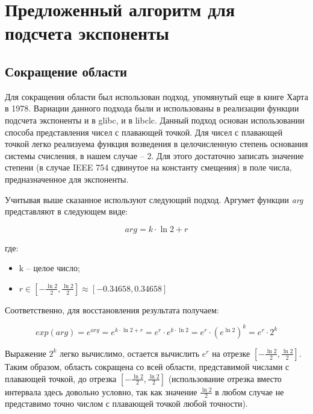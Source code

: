 \chapter{Предложенный алгоритм для подсчета экспоненты}

\section{Сокращение области}

Для сокращения области был использован подход, упомянутый еще в книге Харта\cite{hart} в 1978.
Вариации данного подхода были и использованы в реализации функции подсчета экспоненты и в glibc, и в libclc.
Данный подход основан использовании способа представления чисел с плавающей точкой.
Для чисел с плавающей точкой легко реализуема функция возведения в целочисленную степень основания системы счисления, в нашем случае -- 2.
Для этого достаточно записать значение степени (в случае IEEE 754 сдвинутое на константу смещения) в поле числа, предназначенное для экспоненты.

Учитывая выше сказанное используют следующий подход.
Аргумет функции \textit{arg} представляют в следующем виде:

\begin{equation}
    arg = k \cdot \ln{2} + r
    \label{eq:exp:reduce}
\end{equation}

где:

\begin{itemize}
    \item[] k -- целое число;
    \item[] $r \in [-\frac{\ln{2}}{2}, \frac{\ln{2}}{2}] \approx [-0.34658, 0.34658]$
\end{itemize}

Соответственно, для восстановления результата получаем:

\begin{equation}
    exp(arg) = e^{arg} = e^{k \cdot \ln{2} + r} = e^{r} \cdot e^{k \cdot \ln{2}} = e^{r} \cdot (e^{\ln{2}})^{k} = e^{r} \cdot 2^{k}
    \label{eq:exp:reconstr}
\end{equation}

Выражение $2^{k}$ легко вычислимо, остается вычислить $e^{r}$ на отрезке $[-\frac{\ln{2}}{2}, \frac{\ln{2}}{2}]$.
Таким образом, область сокращена со всей области, представимой числами с плавающей точкой, до отрезка $[-\frac{\ln{2}}{2}, \frac{\ln{2}}{2}]$ (использование отрезка вместо интервала здесь довольно условно, так как значение $\frac{\ln{2}}{2}$ в любом случае не представимо точно числом с плавающей точкой любой точности).

